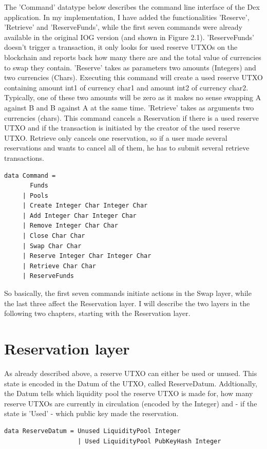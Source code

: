 \documentclass[a4paper,twoside,12pt]{report}
\begin{document}
The 'Command' datatype below describes the command line interface of the Dex application. In my implementation, I have added the functionalities 'Reserve', 'Retrieve' and 'ReserveFunds', while the first seven commands were already available in the original IOG version (and shown in Figure 2.1). 'ReserveFunds' doesn't trigger a transaction, it only looks for used reserve UTXOs on the blockchain and reports back how many there are and the total value of currencies to swap they contain. 
'Reserve' takes as parameters two amounts (Integers) and two currencies (Chars). Executing this command will create a used reserve UTXO containing amount int1 of currency char1 and amount int2 of currency char2. Typically, one of these two amounts will be zero as it makes no sense swapping A against B and B against A at the same time. 'Retrieve' takes as arguments two currencies (chars). This command cancels a Reservation if there is a used reserve UTXO and if the transaction is initiated by the creator of the used reserve UTXO. Retrieve only cancels one reservation, so if a user made several reservations and wants to cancel all of them, he has to submit several retrieve transactions.

\begin{verbatim}
data Command =
       Funds
     | Pools
     | Create Integer Char Integer Char
     | Add Integer Char Integer Char
     | Remove Integer Char Char
     | Close Char Char
     | Swap Char Char
     | Reserve Integer Char Integer Char
     | Retrieve Char Char
     | ReserveFunds
\end{verbatim}

So basically, the first seven commands initiate actions in the Swap layer, while the last three affect the Reservation layer. I will describe the two layers in the following two chapters, starting with the Reservation layer.

\chapter{Reservation layer}

As already described above, a reserve UTXO can either be used or unused. This state is encoded in the Datum of the UTXO, called ReserveDatum. Addtionally, the Datum tells which liquidity pool the reserve UTXO is made for, how many reserve UTXOs are currently in circulation (encoded by the Integer) and - if the state is 'Used' - which public key made the reservation.

\begin{verbatim}
data ReserveDatum = Unused LiquidityPool Integer 
                    | Used LiquidityPool PubKeyHash Integer
\end{verbatim}
\end{document}
